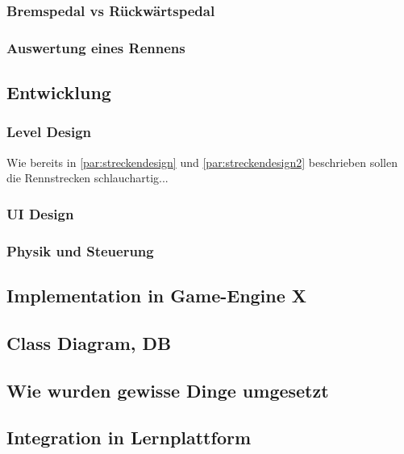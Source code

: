 	\subsubsection{Bremspedal vs Rückwärtspedal}
	\subsubsection{Auswertung eines Rennens}
\subsection{Entwicklung}
	\subsubsection{Level Design}
		Wie bereits in \ref{par:streckendesign} und \ref{par:streckendesign2} beschrieben sollen die Rennstrecken schlauchartig...
	\subsubsection{UI Design}
	\subsubsection{Physik und Steuerung}
	\subsubsection{}
\subsection{Implementation in Game-Engine X}
\subsection{Class Diagram, DB}
\subsection{Wie wurden gewisse Dinge umgesetzt}
\subsection{Integration in Lernplattform}
